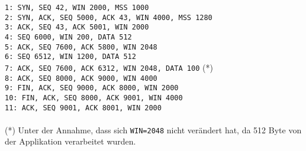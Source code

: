 \documentclass{../exercisesheet}
\begin{document}
\begin{exercise}{5.5}
\texttt{1: SYN, SEQ 42, WIN 2000, MSS 1000} \\
\texttt{2: SYN, ACK, SEQ 5000, ACK 43, WIN 4000, MSS 1280} \\
\texttt{3: ACK, SEQ 43, ACK 5001, WIN 2000} \\
\texttt{4: SEQ 6000, WIN 200, DATA 512} \\
\texttt{5: ACK, SEQ 7600, ACK 5800, WIN 2048} \\
\texttt{6: SEQ 6512, WIN 1200, DATA 512} \\
\texttt{7: ACK, SEQ 7600, ACK 6312, WIN 2048, DATA 100} (*)\\ 
\texttt{8: ACK, SEQ 8000, ACK 9000, WIN 4000} \\
\texttt{9: FIN, ACK, SEQ 9000, ACK 8000, WIN 2000} \\
\texttt{10: FIN, ACK, SEQ 8000, ACK 9001, WIN 4000} \\
\texttt{11: ACK, SEQ 9001, ACK 8001, WIN 2000} \\
\ \\
(*) Unter der Annahme, dass sich \texttt{WIN=2048} nicht verändert hat, da 512 Byte von der Applikation verarbeitet wurden.\\ \ \\
\end{exercise}
\end{document}

